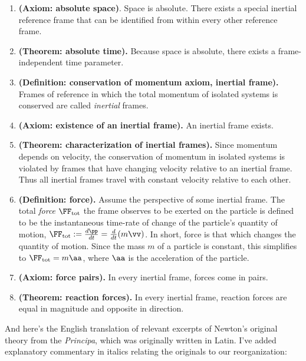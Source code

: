 \documentclass{article}
\begin{document}
\begin{enumerate}
	\item \textbf{(Axiom: absolute space)}. Space is absolute. There exists a special inertial reference frame that can be identified from within every other reference frame.
	
	\item \textbf{(Theorem: absolute time).} Because space is absolute, there exists a frame-independent time parameter.
	
	\item \textbf{(Definition: conservation of momentum axiom, inertial frame).} Frames of reference in which the total momentum of isolated systems is conserved are called \textit{inertial} frames.
	
	\item \textbf{(Axiom: existence of an inertial frame).} An inertial frame exists.
	
	\item \textbf{(Theorem: characterization of inertial frames).} Since momentum depends on velocity, the conservation of momentum in isolated systems is violated by frames that have changing velocity relative to an inertial frame. Thus all inertial frames travel with constant velocity relative to each other.
	
	\item \textbf{(Definition: force).} Assume the perspective of some inertial frame. The total \textit{force} $\FF_{\text{tot}}$ the frame observes to be exerted on the particle is defined to be the instantaneous time-rate of change of the particle's quantity of motion, $\FF_{\text{tot}} := \frac{d\pp}{dt} = \frac{d}{dt}(m\vv)$. In short, force is that which changes the quantity of motion. Since the mass $m$ of a particle is constant, this simplifies to $\FF_{\text{tot}} = m\aa$, where $\aa$ is the acceleration of the particle.
	
	\item \textbf{(Axiom: force pairs).} In every inertial frame, forces come in pairs.
	
	\item \textbf{(Theorem: reaction forces).} In every inertial frame, reaction forces are equal in magnitude and opposite in direction.
\end{enumerate}

And here's the English translation of relevant excerpts of Newton's original theory from the \textit{Principa}, which was originally written in Latin. I've added explanatory commentary in italics relating the originals to our reorganization:
\end{document}
